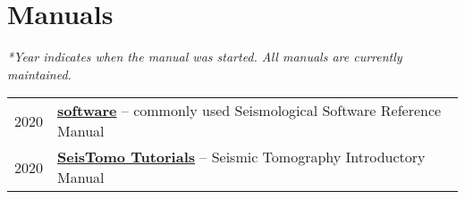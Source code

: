 \section*{Manuals}

\textit{*Year indicates when the manual was started. All manuals are currently maintained.}

\begin{tabular}{p{} p{}}
2020 &	\textbf{\href{https://seismo-learn.org/software/}{software}} -- commonly used Seismological Software Reference Manual \\
2020 &  \textbf{\href{https://migg-ntu.github.io/SeisTomo_Tutorials/}{SeisTomo Tutorials}} -- Seismic Tomography Introductory Manual \\
\end{tabular}
